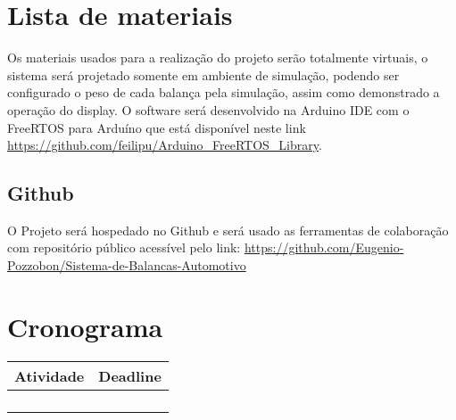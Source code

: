 \documentclass[a4paper, 12pt]{article}
\begin{document}
	\section{Lista de materiais}
	Os materiais usados para a realização do projeto serão totalmente virtuais, o sistema será projetado somente em ambiente de simulação, podendo ser configurado o peso de cada balança pela simulação, assim como demonstrado a operação do display. O software será desenvolvido na Arduino IDE com o FreeRTOS para Arduíno que está disponível neste link \url{https://github.com/feilipu/Arduino_FreeRTOS_Library}.
	
	\subsection{Github}
	O Projeto será hospedado no Github e será usado as ferramentas de colaboração com repositório público acessível pelo link: \url{https://github.com/Eugenio-Pozzobon/Sistema-de-Balancas-Automotivo}
	
	\section{Cronograma}
	\begin{table}[htb]
		\centering
		\begin{tabular}{c|c}
			Atividade & Deadline \\ \hline
				&	\\ \hline
				&	\\ \hline
				&	\\ \hline
				&	\\
		\end{tabular}
	\end{table}
	
	
\end{document}
